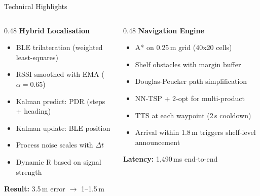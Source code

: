 \documentclass[aspectratio=169,12pt]{beamer}
\begin{document}
\begin{frame}{Technical Highlights}
\begin{columns}[T]
\begin{column}{0.48\textwidth}
\textbf{Hybrid Localisation}
\begin{itemize}
    \item BLE trilateration (weighted least-squares)
    \item RSSI smoothed with EMA ($\alpha = 0.65$)
    \item Kalman predict: PDR (steps + heading)
    \item Kalman update: BLE position
    \item Process noise scales with $\Delta t$
    \item Dynamic R based on signal strength
\end{itemize}
\vspace{0.5em}
\textbf{Result:} 3.5\,m error $\rightarrow$ 1--1.5\,m
\end{column}
\begin{column}{0.48\textwidth}
\textbf{Navigation Engine}
\begin{itemize}
    \item A* on 0.25\,m grid (40x20 cells)
    \item Shelf obstacles with margin buffer
    \item Douglas-Peucker path simplification
    \item NN-TSP + 2-opt for multi-product
    \item TTS at each waypoint (2\,s cooldown)
    \item Arrival within 1.8\,m triggers shelf-level announcement
\end{itemize}
\vspace{0.5em}
\textbf{Latency:} 1,490\,ms end-to-end
\end{column}
\end{columns}
\end{frame}
\end{document}
